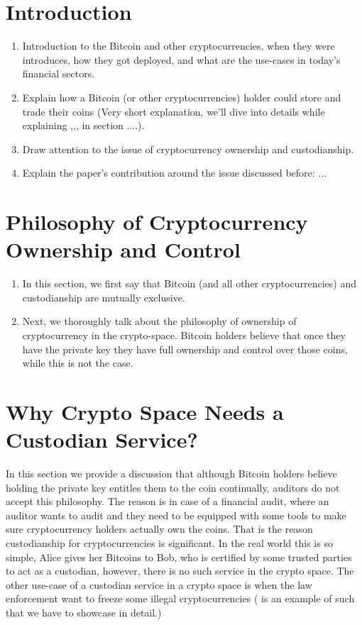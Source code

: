 \section{Introduction}

\begin{enumerate}
\item{Introduction to the Bitcoin and other cryptocurrencies, when they were introduces, how they got deployed, and what are the use-cases in today's financial sectors.}
\item{Explain how a Bitcoin (or other cryptocurrencies) holder could store and trade their coins (Very short explanation, we'll dive into details while explaining ,,, in section ....).}
\item{Draw attention to the issue of cryptocurrency ownership and custodianship.}
\item{Explain the paper's contribution around the issue discussed before: ...}
\end{enumerate}


\section{Philosophy of Cryptocurrency Ownership and Control}

\begin{enumerate}
\item{In this section, we first say that Bitcoin (and all other cryptocurrencies) and custodianship are mutually exclusive.}
\item{Next, we thoroughly talk about the philosophy of ownership of cryptocurrency in the crypto-space.  Bitcoin holders believe that once they have the private key they have full ownership and control over those coins, while this is not the case.}
\end{enumerate}


\section{Why Crypto Space Needs a Custodian Service?}

In this section we provide a discussion that although Bitcoin holders believe holding the private key entitles them to the coin continually, auditors do not accept this philosophy. The reason is in case of a financial audit, where an auditor wants to audit and they need to be equipped with some tools to make sure cryptocurrency holders actually own the coins. That is the reason custodianship for cryptocurrencies is significant. In the real world this is so simple, Alice gives her Bitcoins to Bob, who is certified by some trusted parties to act as a custodian, however, there is no such service in the crypto space. The other use-case of a custodian service in a crypto space is when the law enforcement  want to freeze some illegal cryptocurrencies (\cite{Bitcoins81:online} is an example of such that we have to showcase in detail.) 


